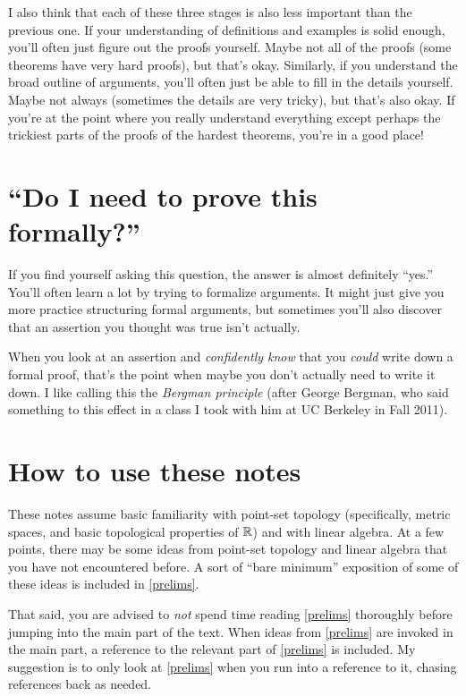 I also think that each of these three stages is also less important than the previous one. If your understanding of definitions and examples is solid enough, you'll often just figure out the proofs yourself. Maybe not all of the proofs (some theorems have very hard proofs), but that's okay. Similarly, if you understand the broad outline of arguments, you'll often just be able to fill in the details yourself. Maybe not always (sometimes the details are very tricky), but that's also okay. If you're at the point where you really understand everything except perhaps the trickiest parts of the proofs of the hardest theorems, you're in a good place! 

\section*{``Do I need to prove this formally?''}

If you find yourself asking this question, the answer is almost definitely ``yes.'' You'll often learn a lot by trying to formalize arguments. It might just give you more practice structuring formal arguments, but sometimes you'll also discover that an assertion you thought was true isn't actually.  

When you look at an assertion and \emph{confidently know} that you \emph{could} write down a formal proof, that's the point when maybe you don't actually need to write it down. I like calling this the \emph{Bergman principle} (after George Bergman, who said something to this effect in a class I took with him at UC Berkeley in Fall 2011).

\section*{How to use these notes}

These notes assume basic familiarity with point-set topology (specifically, metric spaces, and basic topological properties of $\mathbb{R}$) and with linear algebra. At a few points, there may be some ideas from point-set topology and linear algebra that you have not encountered before. A sort of ``bare minimum'' exposition of some of these ideas is included in \cref{prelims}. 

That said, you are advised to \emph{not} spend time reading \cref{prelims} thoroughly before jumping into the main part of the text. When ideas from \cref{prelims} are invoked in the main part, a reference to the relevant part of \cref{prelims} is included. My suggestion is to only look at \cref{prelims} when you run into a reference to it, chasing references back as needed. 

